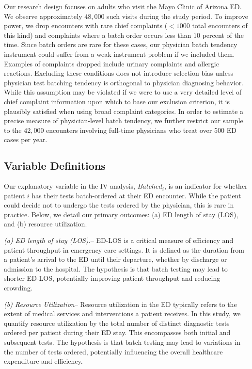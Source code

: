 \documentclass[,,nonblindrev]{informs}
\begin{document}
Our research design focuses on adults who visit the Mayo Clinic of
Arizona ED. We observe approximately \(48,000\) such visits during the
study period. To improve power, we drop encounters with rare chief
complaints (\(<1000\) total encounters of this kind) and complaints
where a batch order occurs less than \(10\) percent of the time. Since
batch orders are rare for these cases, our physician batch tendency
instrument could suffer from a weak instrument problem if we included
them. Examples of complaints dropped include urinary complaints and
allergic reactions. Excluding these conditions does not introduce
selection bias unless physician test batching tendency is orthogonal to
physician diagnosing behavior. While this assumption may be violated if
we were to use a very detailed level of chief complaint information upon
which to base our exclusion criterion, it is plausibly satisfied when
using broad complaint categories. In order to estimate a precise measure
of physician-level batch tendency, we further restrict our sample to the
\(42,000\) encounters involving full-time physicians who treat over 500
ED cases per year.

\hypertarget{variable-definitions}{%
\subsection{Variable Definitions}\label{variable-definitions}}

Our explanatory variable in the IV analysis, \(Batched_i\), is an
indicator for whether patient \(i\) has their tests batch-ordered at
their ED encounter. While the patient could decide not to undergo the
tests ordered by the physician, this is rare in practice. Below, we
detail our primary outcomes: (a) ED length of stay (LOS), and (b)
resource utilization.

\emph{(a) ED length of stay (LOS).}-- ED-LOS is a critical measure of
efficiency and patient throughput in emergency care settings. It is
defined as the duration from a patient's arrival to the ED until their
departure, whether by discharge or admission to the hospital. The
hypothesis is that batch testing may lead to shorter ED-LOS, potentially
improving patient throughput and reducing crowding.

\emph{(b) Resource Utilization}-- Resource utilization in the ED
typically refers to the extent of medical services and interventions a
patient receives. In this study, we quantify resource utilization by the
total number of distinct diagnostic tests ordered per patient during
their ED stay. This encompasses both initial and subsequent tests. The
hypothesis is that batch testing may lead to variations in the number of
tests ordered, potentially influencing the overall healthcare
expenditure and efficiency.
\end{document}
